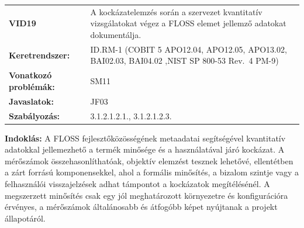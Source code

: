 \documentclass[12pt,magyar,a4paper,oneside]{scrreprt}
\begin{document}
\begin{longtable}[]{@{}ll@{}}
\toprule
\endhead
\begin{minipage}[t]{0.16\columnwidth}\raggedright
\textbf{VID19}\strut
\end{minipage} & \begin{minipage}[t]{0.79\columnwidth}\raggedright
A kockázatelemzés során a szervezet kvantitatív vizsgálatokat végez a
FLOSS elemet jellemző adatokat dokumentálja.\strut
\end{minipage}\tabularnewline
\begin{minipage}[t]{0.16\columnwidth}\raggedright
\textbf{Keretrendszer:}\strut
\end{minipage} & \begin{minipage}[t]{0.79\columnwidth}\raggedright
ID.RM-1 (COBIT 5 APO12.04, APO12.05, APO13.02, BAI02.03, BAI04.02 ,NIST
SP 800-53 Rev.~4 PM-9)\strut
\end{minipage}\tabularnewline
\begin{minipage}[t]{0.16\columnwidth}\raggedright
\textbf{Vonatkozó problémák:}\strut
\end{minipage} & \begin{minipage}[t]{0.79\columnwidth}\raggedright
SM11\strut
\end{minipage}\tabularnewline
\begin{minipage}[t]{0.16\columnwidth}\raggedright
\textbf{Javaslatok:}\strut
\end{minipage} & \begin{minipage}[t]{0.79\columnwidth}\raggedright
JF03\strut
\end{minipage}\tabularnewline
\begin{minipage}[t]{0.16\columnwidth}\raggedright
\textbf{Szabályozás:}\strut
\end{minipage} & \begin{minipage}[t]{0.79\columnwidth}\raggedright
3.1.2.1.2.1., 3.1.2.1.2.3.\strut
\end{minipage}\tabularnewline
\bottomrule
\end{longtable}

\textbf{Indoklás: } A FLOSS fejlesztőközösségének metaadatai
segítségével kvantitatív adatokkal jellemezhető a termék minősége és a
használatával járó kockázat. A mérőszámok összehasonlíthatóak, objektív
elemzést tesznek lehetővé, ellentétben a zárt forrású komponensekkel,
ahol a formális minősítés, a bizalom szintje vagy a felhasználói
visszajelzések adhat támpontot a kockázatok megítélésénél. A megszerzett
minősítés csak egy jól meghatározott környezetre és konfigurációra
érvényes, a mérőszámok általánosabb és átfogóbb képet nyújtanak a
projekt állapotáról.
\end{document}
